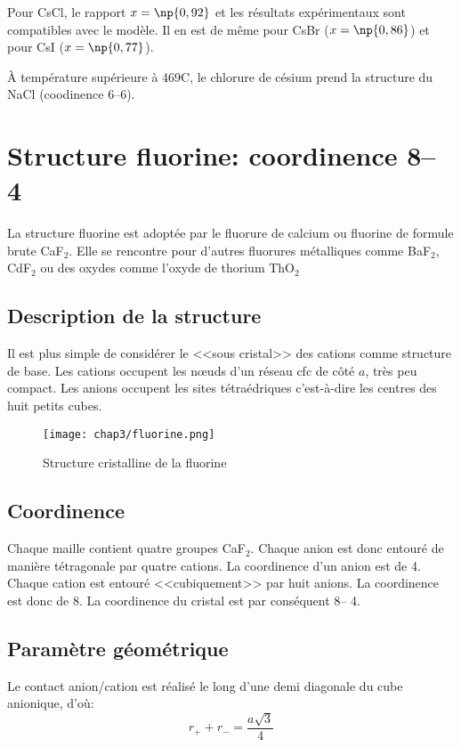 \begin{rem}
    Pour CsCl, le rapport $x = \np{0,92}$ et les résultats 
    expérimentaux sont 
    compatibles avec le modèle. Il en est de même pour CsBr
    ($x = \np{0,86}$) et pour CsI ($x = \np{0,77}$).
\end{rem}
\begin{rem}
    \`A température supérieure à 469\degre C, le chlorure de césium
    prend la structure du NaCl (coodinence 6\---6).
\end{rem}



\section{Structure fluorine: coordinence 8\--- 4}
La structure fluorine est adoptée par le fluorure de calcium ou fluorine de formule
brute CaF$_2$. Elle se rencontre pour d'autres fluorures métalliques comme
BaF$_2$, CdF$_2$ ou des oxydes comme l'oxyde de 
thorium ThO$_2$


\subsection{Description de la structure}
Il est plus simple de considérer le <<sous cristal>> des cations comme structure de base.
Les cations occupent les n\oe uds d'un réseau cfc de côté $a$, très peu compact. Les anions
occupent les sites tétraédriques c'est-à-dire les centres des huit petits cubes.
\begin{figure}
    \centering
    \texttt{[image: chap3/fluorine.png]}
    \caption{Structure cristalline de la fluorine}\label{fig:3_fluorine}
\end{figure}


\subsection{Coordinence}
Chaque maille contient quatre groupes CaF$_2$. Chaque anion est donc entouré de
manière tétragonale par quatre cations. La coordinence d'un anion est de 4.
Chaque cation est entouré <<cubiquement>> par huit anions. La coordinence est donc
de 8. La coordinence du cristal est par conséquent 8\--- 4.


\subsection{Paramètre géométrique}
Le contact anion/cation est réalisé le long d'une demi diagonale du cube anionique,
d'où:
\begin{equation}
    r_+ + r_- = \frac{a\sqrt{3}}{4}
    \label{eq:3_caf2_r+r-a}
\end{equation}


